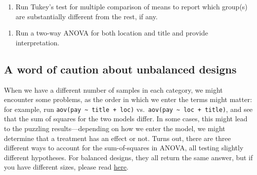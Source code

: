 \documentclass[
  letterpaper,
  DIV=11,
  numbers=noendperiod]{scrreprt}
\newenvironment{Shaded}{\begin{snugshade}}{\end{snugshade}}
\providecommand{\tightlist}{%
  \setlength{\itemsep}{0pt}\setlength{\parskip}{0pt}}\usepackage{longtable,booktabs,array}
\begin{document}
\begin{Shaded}
\begin{Highlighting}[]

\end{Highlighting}
\end{Shaded}

\begin{enumerate}
\def\labelenumi{\arabic{enumi}.}
\setcounter{enumi}{2}
\tightlist
\item
  Run Tukey's test for multiple comparison of means to report which
  group(s) are substantially different from the rest, if any.
\end{enumerate}

\begin{Shaded}
\begin{Highlighting}[]

\end{Highlighting}
\end{Shaded}

\begin{enumerate}
\def\labelenumi{\arabic{enumi}.}
\setcounter{enumi}{3}
\tightlist
\item
  Run a two-way ANOVA for both location and title and provide
  interpretation.
\end{enumerate}

\begin{Shaded}
\begin{Highlighting}[]

\end{Highlighting}
\end{Shaded}

\subsection{A word of caution about unbalanced
designs}\label{a-word-of-caution-about-unbalanced-designs}

When we have a different number of samples in each category, we might
encounter some problems, as the order in which we enter the terms might
matter: for example, run
\texttt{aov(pay\ \textasciitilde{}\ title\ +\ loc)}
vs.~\texttt{aov(pay\ \textasciitilde{}\ loc\ +\ title)}, and see that
the sum of squares for the two models differ. In some cases, this might
lead to the puzzling results---depending on how we enter the model, we
might determine that a treatment has an effect or not. Turns out, there
are three different ways to account for the sum-of-squares in ANOVA, all
testing slightly different hypotheses. For balanced designs, they all
return the same answer, but if you have different sizes, please read
\href{https://mcfromnz.wordpress.com/2011/03/02/anova-type-iiiiii-ss-explained/}{here}.
\end{document}
